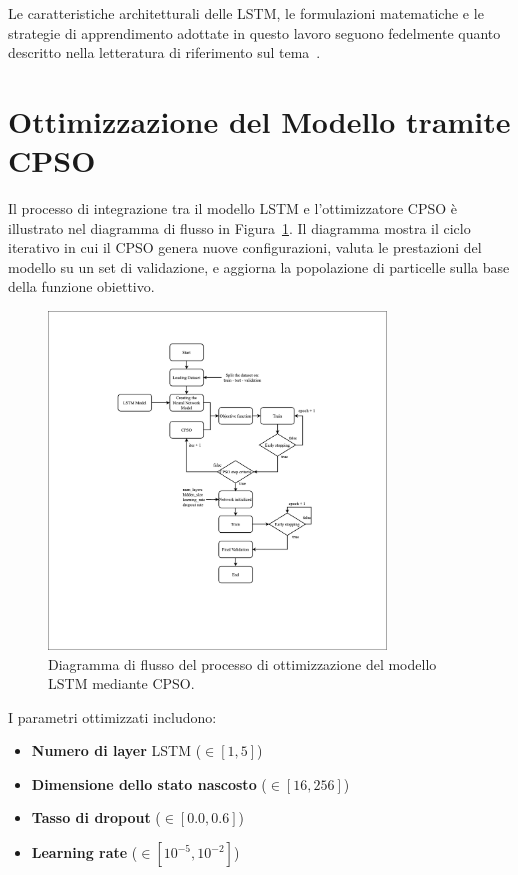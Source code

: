 \documentclass{article}
\begin{document}
\bigskip

Le caratteristiche architetturali delle LSTM, le formulazioni matematiche e le strategie di apprendimento adottate in questo lavoro seguono fedelmente quanto descritto nella letteratura di riferimento sul tema~\cite{hochreiter1997long, graves2013speech, greff2017lstm}.


\section{Ottimizzazione del Modello tramite CPSO}

Il processo di integrazione tra il modello LSTM e l’ottimizzatore CPSO è illustrato nel diagramma di flusso in Figura~\ref{fig:cpso_flowchart}. Il diagramma mostra il ciclo iterativo in cui il CPSO genera nuove configurazioni, valuta le prestazioni del modello su un set di validazione, e aggiorna la popolazione di particelle sulla base della funzione obiettivo.

\begin{figure}[H]
    \centering
    \includegraphics[width=0.8\textwidth]{img/LSTM-CPSO-MODEL.png}
    \caption{Diagramma di flusso del processo di ottimizzazione del modello LSTM mediante CPSO.}
    \label{fig:cpso_flowchart}
\end{figure}

I parametri ottimizzati includono:
\begin{itemize}
    \item \textbf{Numero di layer} LSTM ($\in [1, 5]$)
    \item \textbf{Dimensione dello stato nascosto} ($\in [16, 256]$)
    \item \textbf{Tasso di dropout} ($\in [0.0, 0.6]$)
    \item \textbf{Learning rate} ($\in [10^{-5}, 10^{-2}]$)
\end{itemize}
\end{document}
